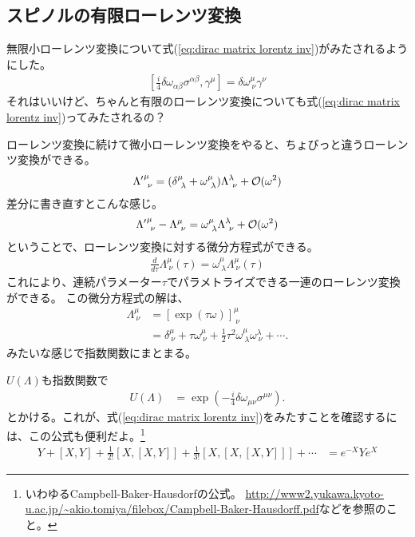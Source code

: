\documentclass[10pt,a4paper]{jarticle}
\begin{document}
\subsection{スピノルの有限ローレンツ変換}
無限小ローレンツ変換について式(\ref{eq:dirac matrix lorentz inv})がみたされるようにした。
\begin{align}
\left[ \frac{i}{4}\delta\omega_{\alpha\beta} \sigma^{\alpha\beta}, \gamma^\mu \right] = 
\delta\omega^\mu_{~\nu} \gamma^\nu
\end{align}
それはいいけど、ちゃんと有限のローレンツ変換についても式(\ref{eq:dirac matrix lorentz inv})ってみたされるの？

ローレンツ変換に続けて微小ローレンツ変換をやると、ちょびっと違うローレンツ変換ができる。
\begin{align}
{\Lambda'}^\mu_{~\nu} = (\delta^\mu_{~\lambda} + \omega^\mu_{~\lambda} ) \Lambda^\lambda_{~\nu} + {\cal O}(\omega^2)
\end{align}
%
差分に書き直すとこんな感じ。
\begin{align}
{\Lambda'}^\mu_{~\nu} - {\Lambda}^\mu_{~\nu} = \omega^\mu_{~\lambda} \Lambda^\lambda_{~\nu} + {\cal O}(\omega^2)
\end{align}
%
ということで、ローレンツ変換に対する微分方程式ができる。
\begin{align}
\frac{d}{d\tau} {\Lambda}^\mu_{~\nu}(\tau) = \omega^\mu_{~\lambda} {\Lambda}^\mu_{~\nu}(\tau)
\end{align}
これにより、連続パラメーター$\tau$でパラメトライズできる一連のローレンツ変換ができる。
この微分方程式の解は、
\begin{align}
\Lambda^\mu_{~\nu}
&= [\exp(\tau\omega)]^\mu_{~\nu} \nonumber\\
&= \delta^\mu_{~\nu} + \tau \omega^\mu_{~\nu} + \frac{1}{2} \tau^2 \omega^\mu_{~\lambda}\omega^\lambda_{~\nu} + \cdots.
\end{align}
みたいな感じで指数関数にまとまる。

$U(\Lambda)$も指数関数で
\begin{align}
U(\Lambda) &= \exp\left( -\frac{i}{4} \delta\omega_{\mu\nu} \sigma^{\mu\nu} \right).
\end{align}
とかける。これが、式(\ref{eq:dirac matrix lorentz inv})をみたすことを確認するには、この公式も便利だよ。\footnote{
いわゆるCampbell-Baker-Hausdorfの公式。
\url{http://www2.yukawa.kyoto-u.ac.jp/~akio.tomiya/filebox/Campbell-Baker-Hausdorff.pdf}などを参照のこと。
}
\begin{align}
Y + [X,Y] + \frac{1}{2!} [X,[X,Y]] + \frac{1}{3!} [X,[X,[X,Y]]] + \cdots &= e^{-X} Y e^X
\end{align}
\end{document}
